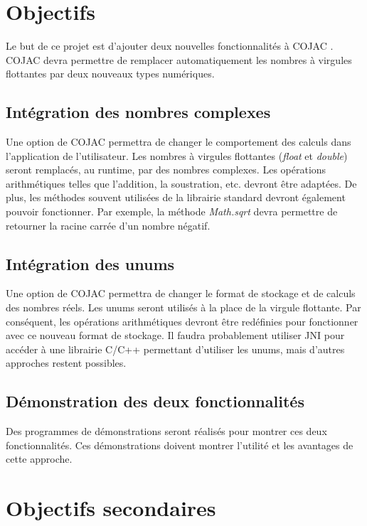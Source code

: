 \section{Objectifs}

Le but de ce projet est d'ajouter deux nouvelles fonctionnalités à COJAC \cite{COJAC}. COJAC devra permettre de remplacer automatiquement les nombres à virgules flottantes par deux nouveaux types numériques.

\subsection{Intégration des nombres complexes}

Une option de COJAC permettra de changer le comportement des calculs dans l'application de l'utilisateur. Les nombres à virgules flottantes (\textit{float} et \textit{double}) seront remplacés, au runtime, par des nombres complexes. Les opérations arithmétiques telles que l'addition, la soustration, etc. devront être adaptées. De plus, les méthodes souvent utilisées de la librairie standard devront également pouvoir fonctionner. Par exemple, la méthode \textit{Math.sqrt} devra permettre de retourner la racine carrée d'un nombre négatif.

\subsection{Intégration des unums}

Une option de COJAC permettra de changer le format de stockage et de calculs des nombres réels. Les unums seront utilisés à la place de la virgule flottante. Par conséquent, les opérations arithmétiques devront être redéfinies pour fonctionner avec ce nouveau format de stockage. Il faudra probablement utiliser JNI pour accéder à une librairie C/C++ permettant d'utiliser les unums, mais d'autres approches restent possibles.

\subsection{Démonstration des deux fonctionnalités}

Des programmes de démonstrations seront réalisés pour montrer ces deux fonctionnalités. Ces démonstrations doivent montrer l'utilité et les avantages de cette approche.

\section{Objectifs secondaires}


